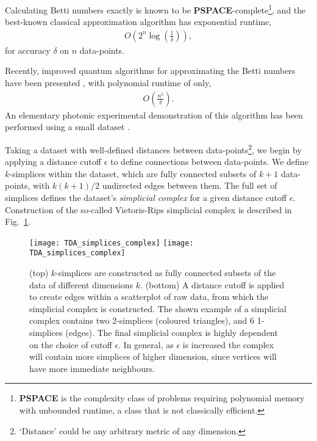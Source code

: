Calculating Betti numbers exactly is known to be \textbf{PSPACE}-complete\footnote{\textbf{PSPACE} is the complexity class of problems requiring polynomial memory with unbounded runtime, a class that is not classically efficient.}, and the best-known classical approximation algorithm has exponential runtime,
\begin{align}
O\left(2^n \log \left(\frac{1}{\delta}\right)\right),
\end{align}
for accuracy $\delta$ on $n$ data-points.

Recently, improved quantum algorithms for approximating the Betti numbers have been presented \cite{bib:lloyd2016quantum, bib:PhysRevLett.113.130503, bib:GiovannettiLloyd08}, with polynomial runtime of only,
\begin{align}
O\left(\frac{n^5}{\delta}\right).
\end{align}
An elementary photonic experimental demonstration of this algorithm has been performed using a small dataset \cite{bib:LuRohdeTDAopt}.

Taking a dataset with well-defined distances between data-points\footnote{`Distance' could be any arbitrary metric of any dimension.}, we begin by applying a distance cutoff $\epsilon$ to define connections between data-points. We define $k$-simplices within the dataset, which are fully connected subsets of \mbox{$k+1$} data-points, with \mbox{$k(k+1)/2$} undirected edges between them. The full set of simplices defines the dataset's \textit{simplicial complex} for a given distance cutoff $\epsilon$. Construction of the so-called Vietoris-Rips simplicial complex is described in Fig.~\ref{fig:TDA_simplex}.

\begin{figure}[!htbp]
\pubmode
	\texttt{[image: TDA\_simplices\_complex]}
\else
	\texttt{[image: TDA\_simplices\_complex]}
\fi
\captionspacefig \caption{(top) $k$-simplices are constructed as fully connected subsets of the data of different dimensions $k$. (bottom) A distance cutoff is applied to create edges within a scatterplot of raw data, from which the simplicial complex is constructed. The shown example of a simplicial complex contains two 2-simplices (coloured triangles), and 6 1-simplices (edges). The final simplicial complex is highly dependent on the choice of cutoff $\epsilon$. In general, as $\epsilon$ is increased the complex will contain more simplices of higher dimension, since vertices will have more immediate neighbours.} \label{fig:TDA_simplex}	
\end{figure}

